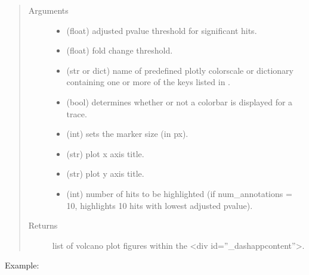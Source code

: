 \documentclass[letterpaper,10pt,english]{sphinxmanual}
\begin{document}
\begin{fulllineitems}
\begin{quote}
\begin{description}
\begin{itemize}
\end{itemize}

\item[{Arguments}] \leavevmode\begin{itemize}
\item {} 
 (float) \textendash{} adjusted p\sphinxhyphen{}value threshold for significant hits.

\item {} 
 (float) \textendash{} fold change threshold.

\item {} 
 (str or dict) \textendash{} name of predefined plotly colorscale or dictionary containing one or more of the keys listed in                                     .

\item {} 
 (bool) \textendash{} determines whether or not a colorbar is displayed for a trace.

\item {} 
 (int) \textendash{} sets the marker size (in px).

\item {} 
 (str) \textendash{} plot x axis title.

\item {} 
 (str) \textendash{} plot y axis title.

\item {} 
 (int) \textendash{} number of hits to be highlighted (if num\_annotations = 10, highlights 10 hits with lowest adjusted p\sphinxhyphen{}value).

\end{itemize}

\item[{Returns}] \leavevmode
list of volcano plot figures within the \textless{}div id=”\_dash\sphinxhyphen{}app\sphinxhyphen{}content”\textgreater{}.

\end{description}\end{quote}

Example:


\end{fulllineitems}
\end{document}
